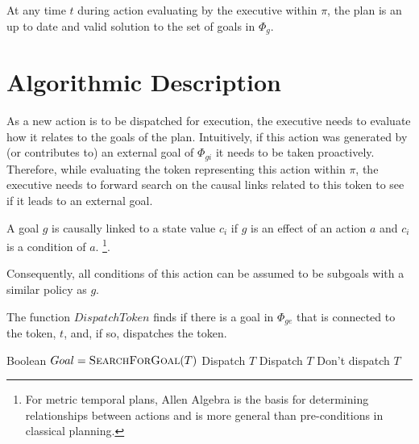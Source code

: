 At any time $t$ during action evaluating by the executive within
$\pi$, the plan is an up to date and valid solution to the set of
goals in $\Phi_g$.


\section{Algorithmic Description}
\label{sec:algo}

As a new action is to be dispatched for execution, the executive needs
to evaluate how it relates to the goals of the plan. Intuitively, if
this action was generated by (or contributes to) an external goal of
$\Phi_{gi}$ it needs to be taken proactively. Therefore, while
evaluating the token representing this action within $\pi$, the
executive needs to forward search on the causal links related to this
token to see if it leads to an external goal.


\begin{definition}
  \label{def:subgoalLink}
  A goal $g$ is causally linked to a state value $c_i$ if
  $g$ is an effect of an action $a$ and $c_i$ is a condition of $a$.
  \footnote{For metric temporal plans, Allen Algebra
    \cite{allen84} is the basis for determining relationships between
    actions and is more general than pre-conditions in classical
    planning.}.
\end{definition}

Consequently, all conditions of this action can be assumed to be
subgoals with a similar policy as $g$.

\begin{algorithm} [H]
  \caption{\small The function $DispatchToken$ finds if there is a
    goal in $\Phi_{ge}$ that is connected to the token, $t$, and, if
    so, dispatches the token.}
  \label{alg:dispatch}
\label{DispatchToken}
\begin{algorithmic}
\small 
{}
\State Boolean $Goal = \textsc{SearchForGoal}( T )$
	\State \Return Dispatch $T$
	\State \Return Dispatch $T$
\Else
	\State \Return Don't dispatch $T$
\EndIf
\EndFunction
\end{algorithmic}
\end{algorithm}

